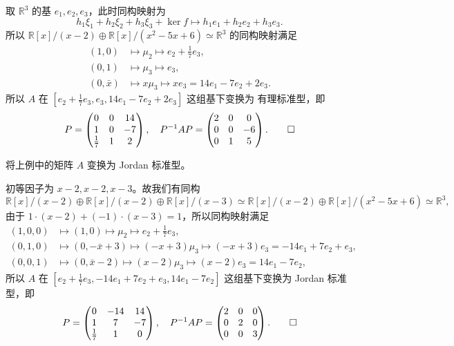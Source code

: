 \documentclass[fontset=none,zihao=-4]{Notes}
\begin{document}
\begin{solution}
  取 $\mathbb{R}^3$ 的基 $e_1,e_2,e_3$，此时同构映射为
  \[
    h_1\xi_1+h_2\xi_2+h_3\xi_3+\ker f\mapsto h_1e_1+h_2e_2+h_3e_3.
  \]
  所以 $\mathbb{R}[x]/(x-2)\oplus \mathbb{R}[x]/(x^2-5x+6)\simeq\mathbb{R}^3$ 的同构映射满足
  \begin{align*}
    (1, 0)&\mapsto \mu_2\mapsto e_2+\frac{1}{7}e_3,\\ 
    (0,1)&\mapsto \mu_3\mapsto e_3,\\
    (0,\bar x)&\mapsto x\mu_3\mapsto xe_3=14e_1-7e_2+2e_3.
  \end{align*}
  所以 $A$ 在 $[e_2+\frac{1}{7}e_3,e_3,14e_1-7e_2+2e_3]$ 这组基下变换为
  有理标准型，即
  \[
    P=\begin{pmatrix}
      0 & 0 & 14 \\
      1 & 0 & -7 \\
      \frac{1}{7} & 1 & 2
    \end{pmatrix} ,\quad
    P^{-1}AP=\begin{pmatrix}
      2 & 0 & 0 \\
      0 & 0 & -6 \\
      0 & 1 & 5
    \end{pmatrix}.\qedhere
  \]
\end{solution}

\begin{example}
  将上例中的矩阵 $A$ 变换为 Jordan 标准型。
\end{example}

\begin{solution}
  初等因子为 $x-2,x-2,x-3$。故我们有同构
  \[
    \mathbb{R}[x]/(x-2)\oplus\mathbb{R}[x]/(x-2)\oplus\mathbb{R}[x]/(x-3)
    \simeq\mathbb{R}[x]/(x-2)\oplus \mathbb{R}[x]/(x^2-5x+6)\simeq\mathbb{R}^3,
  \]
  由于 $1\cdot(x-2)+(-1)\cdot (x-3)=1$，所以同构映射满足
  \begin{align*}
    (1,0,0)&\mapsto (1,0)\mapsto \mu_2\mapsto e_2+\frac{1}{7}e_3,\\
    (0,1,0)&\mapsto (0,-\bar x+3)\mapsto (-x+3)\mu_3\mapsto
    (-x+3)e_3=-14e_1+7e_2+e_3,\\
    (0,0,1)&\mapsto (0,\bar x-2)\mapsto (x-2)\mu_3\mapsto (x-2)e_3=14e_1-7e_2,
  \end{align*}
  所以 $A$ 在 $[e_2+\frac{1}{7}e_3,-14e_1+7e_2+e_3,14e_1-7e_2]$ 这组基下变换为 Jordan 标准型，即
  \[
    P=\begin{pmatrix}
      0 & -14 & 14 \\
      1 & 7 & -7 \\
      \frac{1}{7} & 1 & 0
    \end{pmatrix},\quad P^{-1}AP=
    \begin{pmatrix}
      2 & 0 & 0 \\
      0 & 2 & 0 \\
      0 & 0 & 3
    \end{pmatrix}.\qedhere
  \]
\end{solution}
\end{document}
